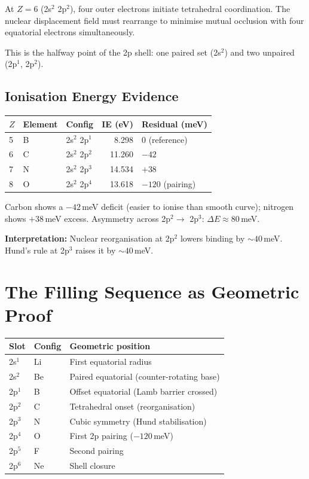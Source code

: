 At $Z = 6$ (2s$^2$ 2p$^2$), four outer electrons initiate tetrahedral coordination.  The nuclear displacement field must rearrange to minimise mutual occlusion with four equatorial electrons simultaneously.

This is the halfway point of the 2p shell: one paired set (2s$^2$) and two unpaired (2p$^1$, 2p$^2$).

\subsection{Ionisation Energy Evidence}

\begin{center}
\begin{tabular}{lllrl}
\hline
$Z$ & Element & Config & IE (eV) & Residual (meV) \\
\hline
5 & B & 2s$^2$ 2p$^1$ & 8.298 & 0 (reference) \\
6 & C & 2s$^2$ 2p$^2$ & 11.260 & $-42$ \\
7 & N & 2s$^2$ 2p$^3$ & 14.534 & $+38$ \\
8 & O & 2s$^2$ 2p$^4$ & 13.618 & $-120$ (pairing) \\
\hline
\end{tabular}
\end{center}

Carbon shows a $-42$\,meV deficit (easier to ionise than smooth curve); nitrogen shows $+38$\,meV excess.  Asymmetry across 2p$^2 \to$ 2p$^3$: $\Delta E \approx 80$\,meV.

\textbf{Interpretation:} Nuclear reorganisation at 2p$^2$ lowers binding by ${\sim}40$\,meV.  Hund's rule at 2p$^3$ raises it by ${\sim}40$\,meV.


\section{The Filling Sequence as Geometric Proof}

\begin{center}
\begin{tabular}{lll}
\hline
Slot & Config & Geometric position \\
\hline
2s$^1$ & Li & First equatorial radius \\
2s$^2$ & Be & Paired equatorial (counter-rotating base) \\
\hline
2p$^1$ & B & Offset equatorial (Lamb barrier crossed) \\
2p$^2$ & C & Tetrahedral onset (reorganisation) \\
2p$^3$ & N & Cubic symmetry (Hund stabilisation) \\
2p$^4$ & O & First 2p pairing ($-120$\,meV) \\
2p$^5$ & F & Second pairing \\
2p$^6$ & Ne & Shell closure \\
\hline
\end{tabular}
\end{center}

